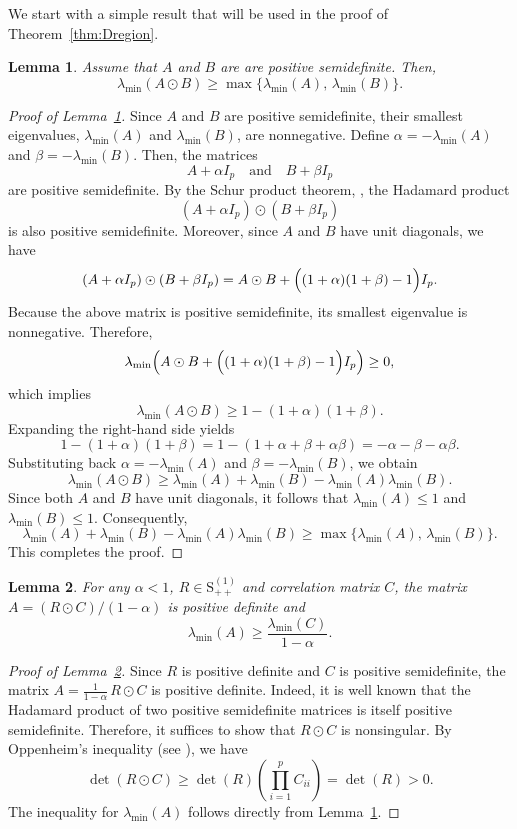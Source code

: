 \documentclass[12pt]{amsart}
\numberwithin{equation}{section}
\numberwithin{equation}{section}
\theoremstyle{plain}
\newtheorem{lemma}{Lemma}
\theoremstyle{definition}
\newcommand{\Sppone}{\mathrm{S}_{++}^{(1)}}
\begin{document}
We start with a simple result that will be used in the proof of Theorem~\ref{thm:Dregion}.  
\begin{lemma}\label{lem:Lmin}
Assume that $A$ and $B$ are are positive semidefinite. Then,
\[
\lambda_{\min}(A\odot B) \geq \max\{ \lambda_{\min}(A),\, \lambda_{\min}(B)\}.
\]
\end{lemma}
\begin{proof}[Proof of Lemma~\ref{lem:Lmin}]
Since $A$ and $B$ are positive semidefinite, their smallest eigenvalues, $\lambda_{\min}(A)$ and $\lambda_{\min}(B)$, are nonnegative.  Define
$\alpha = -\lambda_{\min}(A)$ and $\beta = -\lambda_{\min}(B)$.
Then, the matrices
\[
A+\alpha I_p \quad \text{and} \quad B+\beta I_p
\]
are positive semidefinite. By the Schur product theorem, \cite[Section 7.5]{Horn13}, the Hadamard product
\[
(A+\alpha I_p)\odot (B+\beta I_p)
\]
is also positive semidefinite. Moreover, since $A$ and $B$ have unit diagonals, we have
\[
(A+\alpha I_p)\odot (B+\beta I_p) = A\odot B + \Bigl((1+\alpha)(1+\beta)-1\Bigr) I_p.
\]
Because the above matrix is positive semidefinite, its smallest eigenvalue is nonnegative. Therefore,
\[
\lambda_{\min}\Bigl(A\odot B + \Bigl((1+\alpha)(1+\beta)-1\Bigr) I_p\Bigr) \ge 0,
\]
which implies
\[
\lambda_{\min}(A\odot B) \ge 1 - (1+\alpha)(1+\beta).
\]
Expanding the right-hand side yields
\[
1 - (1+\alpha)(1+\beta) = 1 - (1+\alpha+\beta+\alpha\beta) = -\alpha - \beta - \alpha\beta.
\]
Substituting back $\alpha = -\lambda_{\min}(A)$ and $\beta = -\lambda_{\min}(B)$, we obtain
\[
\lambda_{\min}(A\odot B) \ge \lambda_{\min}(A) + \lambda_{\min}(B) - \lambda_{\min}(A)\lambda_{\min}(B).
\]
Since both $A$ and $B$ have unit diagonals, it follows that $\lambda_{\min}(A) \le 1$ and $\lambda_{\min}(B) \le 1$. Consequently,
\[
\lambda_{\min}(A) + \lambda_{\min}(B) - \lambda_{\min}(A)\lambda_{\min}(B) \ge \max\{\lambda_{\min}(A),\,\lambda_{\min}(B)\}.
\]
This completes the proof.
\end{proof}

\begin{lemma}\label{lem:A>0}
    For any $\alpha<1$, $R\in\Sppone$ and correlation matrix $C$, the matrix $A=(R\odot C)/(1-\alpha)$ is positive definite and 
    \[
    \lambda_{\min}(A) \geq \frac{\lambda_{\min}(C)}{1-\alpha}. 
    \]
\end{lemma}
\begin{proof}[Proof of Lemma~\ref{lem:A>0}]
Since $R$ is positive definite and $C$ is positive semidefinite, the matrix $
A = \frac{1}{1-\alpha}\,R\odot C$
is positive definite. Indeed, it is well known that the Hadamard product of two positive semidefinite matrices is itself positive semidefinite. Therefore, it suffices to show that \(R\odot C\) is nonsingular. By Oppenheim's inequality (see \cite{Opp30}), we have
\[
\det(R\odot C) \ge \det(R) \left(\prod_{i=1}^p C_{ii}\right) = \det(R) > 0.
\]
The inequality for $\lambda_{\min}(A)$ follows directly from Lemma~\ref{lem:Lmin}. 
\end{proof}
\end{document}
